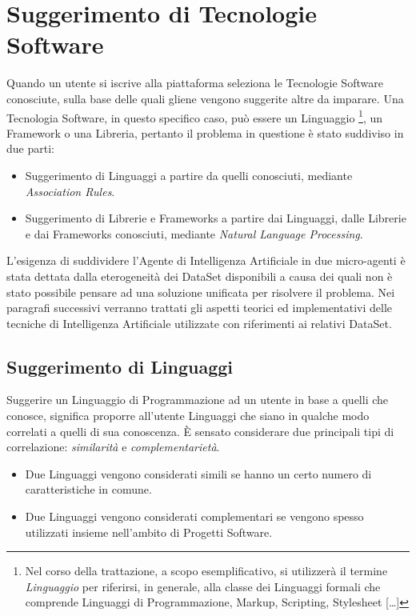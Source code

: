 \section{Suggerimento di Tecnologie Software} %
Quando un utente si iscrive alla piattaforma seleziona le Tecnologie Software conosciute, sulla base delle quali gliene vengono suggerite altre da imparare. Una Tecnologia Software, in questo specifico caso, può essere un Linguaggio \footnote{Nel corso della trattazione, a scopo esemplificativo, si utilizzerà il termine \emph{Linguaggio} per riferirsi, in generale, alla classe dei Linguaggi formali che comprende Linguaggi di Programmazione, Markup, Scripting, Stylesheet [\dots]}, un Framework o una Libreria, pertanto il problema in questione è stato suddiviso in due parti: 
\begin{itemize}
    \item Suggerimento di Linguaggi a partire da quelli conosciuti, mediante \emph{Association Rules}.
    \item Suggerimento di Librerie e Frameworks a partire dai Linguaggi, dalle Librerie e dai Frameworks conosciuti, mediante \emph{Natural Language Processing}. 
\end{itemize}
L'esigenza di suddividere l'Agente di Intelligenza Artificiale in due micro-agenti è stata dettata dalla eterogeneità dei DataSet disponibili a causa dei quali non è stato possibile pensare ad una soluzione unificata per risolvere il problema. Nei paragrafi successivi verranno trattati gli aspetti teorici ed implementativi delle tecniche di Intelligenza Artificiale utilizzate con riferimenti ai relativi DataSet.
\subsection{Suggerimento di Linguaggi}
Suggerire un Linguaggio di Programmazione ad un utente in base a quelli che conosce, significa proporre all'utente Linguaggi che siano in qualche modo correlati a quelli di sua conoscenza. È sensato considerare due principali tipi di correlazione: \emph{similarità} e \emph{complementarietà}.
\begin{itemize}
    \item Due Linguaggi vengono considerati simili se hanno un certo numero di caratteristiche in comune.
    \item Due Linguaggi vengono considerati complementari se vengono spesso utilizzati insieme nell'ambito di Progetti Software.
\end{itemize}
